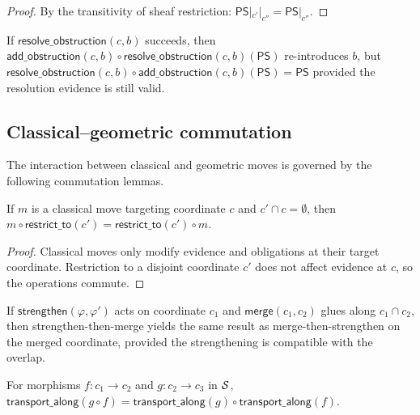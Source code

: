 \documentclass[11pt]{article}
\newcommand{\PS}{\mathsf{PS}}
\begin{document}
\begin{proof}
By the transitivity of sheaf restriction: $\PS|_{c'}|_{c''} = \PS|_{c''}$.
\end{proof}

\begin{lemma}\label{lem:resolve-add}
If $\mathsf{resolve\_obstruction}(c, b)$ succeeds, then
$\mathsf{add\_obstruction}(c, b) \circ
\mathsf{resolve\_obstruction}(c, b)(\PS)$ re-introduces $b$,
but $\mathsf{resolve\_obstruction}(c, b) \circ
\mathsf{add\_obstruction}(c, b)(\PS) = \PS$ provided the
resolution evidence is still valid.
\end{lemma}

\subsection{Classical--geometric commutation}

The interaction between classical and geometric moves is governed
by the following commutation lemmas.

\begin{lemma}%
\label{lem:class-restrict}
If $m$ is a classical move targeting coordinate $c$ and
$c' \cap c = \emptyset$, then
$m \circ \mathsf{restrict\_to}(c') =
\mathsf{restrict\_to}(c') \circ m$.
\end{lemma}

\begin{proof}
Classical moves only modify evidence and obligations at their
target coordinate.  Restriction to a disjoint coordinate $c'$
does not affect evidence at $c$, so the operations commute.
\end{proof}

\begin{lemma}\label{lem:str-merge}
If $\mathsf{strengthen}(\varphi, \varphi')$ acts on coordinate
$c_1$ and $\mathsf{merge}(c_1, c_2)$ glues along
$c_1 \cap c_2$, then strengthen-then-merge yields the same
result as merge-then-strengthen on the merged coordinate,
provided the strengthening is compatible with the overlap.
\end{lemma}

\begin{lemma}%
\label{lem:transport-dist}
For morphisms $f: c_1 \to c_2$ and $g: c_2 \to c_3$ in $\mathcal{S}$,
$\mathsf{transport\_along}(g \circ f) =
\mathsf{transport\_along}(g) \circ \mathsf{transport\_along}(f)$.
\end{lemma}
\end{document}
